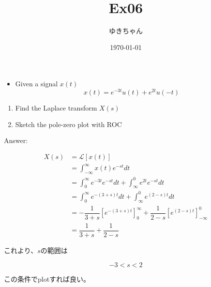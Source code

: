 \documentclass[a4paper,16pt]{jsarticle}
\title{Ex06}
\author{ゆきちゃん}
\date{\today}
\begin{document}
\maketitle

\begin{itemize}
	\item Given a signal $x(t)$
	\begin{equation}
		x(t) = e^{-3t}u(t) + e^{2t}u(-t)
	\end{equation}
\end{itemize}

\begin{enumerate}
	\item Find the Laplace transform $X(s)$
	\item Sketch the pole-zero plot with ROC
\end{enumerate}

Answer:

\begin{align}
	X(s) &= \mathcal{L}[x(t)] \\
	&= \int_{-\infty}^\infty x(t) e^{-st} dt \\
	&= \int_0^\infty e^{-3t}e^{-st} dt + \int_{\infty}^0 e^{2t}e^{-st}dt \\
	&= \int_0^\infty e^{-(3+s)t} dt + \int_{\infty}^0 e^{(2-s)t}dt \\
	&= -\dfrac{1}{3+s}[e^{-(3+s)t}]_0^\infty + \dfrac{1}{2-s}[e^{(2-s)t}]_{-\infty}^0 \\
	&= \dfrac{1}{3+s} + \dfrac{1}{2-s}
\end{align}

これより、$s$の範囲は

\begin{equation}
	-3 < s < 2
\end{equation}

この条件でplotすれば良い。
\end{document}
